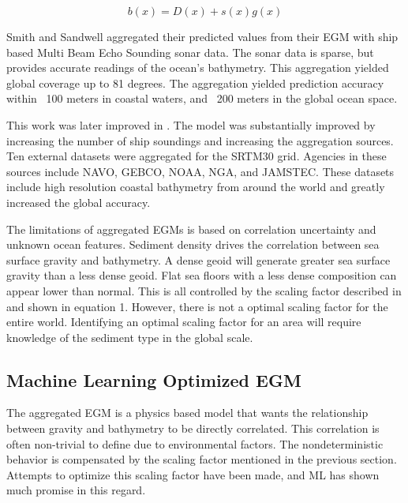 \begin{equation}
    b(x) = D(x) + s(x)g(x)
\end{equation}

\par
Smith and Sandwell aggregated their predicted values from their \ac{EGM} with ship based Multi Beam Echo Sounding sonar data.
The sonar data is sparse, but provides accurate readings of the ocean's bathymetry.
This aggregation yielded global coverage up to 81 degrees.
The aggregation yielded prediction accuracy within ~100 meters in coastal waters, and ~200 meters in the global ocean space.

\par 
This work was later improved in \cite{becker2009global}.
The model was substantially improved by increasing the number of ship soundings and increasing the aggregation sources.
Ten external datasets were aggregated for the SRTM30 grid.
Agencies in these sources include \ac{NAVO}, \ac{GEBCO}, \ac{NOAA}, \ac{NGA}, and \ac{JAMSTEC}.
These datasets include high resolution coastal bathymetry from around the world and greatly increased the global accuracy.

\par
The limitations of aggregated \ac{EGM}s is based on correlation uncertainty and unknown ocean features.
Sediment density drives the correlation between sea surface gravity and bathymetry.
A dense geoid will generate greater sea surface gravity than a less dense geoid.
Flat sea floors with a less dense composition can appear lower than normal.
This is all controlled by the scaling factor described in \cite{smith1994bathymetric} and shown in equation 1. 
However, there is not a optimal scaling factor for the entire world.
Identifying an optimal scaling factor for an area will require knowledge of the sediment type in the global scale.


\subsection{Machine Learning Optimized \ac{EGM}}
The aggregated \ac{EGM} is a physics based model that wants the relationship between gravity and bathymetry to be directly correlated.
This correlation is often non-trivial to define due to environmental factors.
The nondeterministic behavior is compensated by the scaling factor mentioned in the previous section.
Attempts to optimize this scaling factor have been made, and \ac{ML} has shown much promise in this regard.

